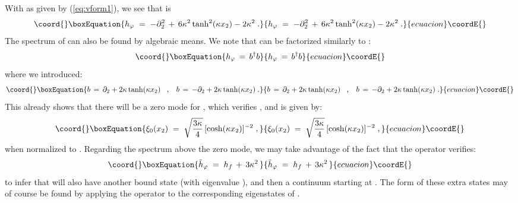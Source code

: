 \documentclass[a4paper,12pt]{article}
\begin{document}
With \coordHE{} as given by (\ref{eq:vform1}), we see that \coordHE{} is
\begin{equation}\coord{}\boxEquation{
h_\varphi \;=\; -\partial_2^2 \,+\, 6 \kappa^2 \tanh^2(\kappa x_2) - 2 \kappa^2 \;.
}{
h_\varphi \;=\; -\partial_2^2 \,+\, 6 \kappa^2 \tanh^2(\kappa x_2) - 2 \kappa^2 \;.
}{ecuacion}\coordE{}\end{equation}
The spectrum of \coordHE{} can also be found  by algebraic means.
We note that \coordHE{} can be factorized similarly to \coordHE{}:
\begin{equation}\coord{}\boxEquation{\label{eq:hphif}
h_\varphi \,=\, b^\dagger b 
}{h_\varphi \,=\, b^\dagger b 
}{ecuacion}\coordE{}\end{equation}
where we introduced: 
\begin{equation}\coord{}\boxEquation{
b \,=\, \partial_2 + 2 \kappa \tanh (\kappa x_2) \;\;\;,\;\;\;
b \,=\, -\partial_2 + 2 \kappa \tanh (\kappa x_2) \;.
}{
b \,=\, \partial_2 + 2 \kappa \tanh (\kappa x_2) \;\;\;,\;\;\;
b \,=\, -\partial_2 + 2 \kappa \tanh (\kappa x_2) \;.
}{ecuacion}\coordE{}\end{equation}
This already shows that there will be a zero mode \coordHE{} for \coordHE{},
which verifies \coordHE{}, and is given by:
\begin{equation}\coord{}\boxEquation{\label{eq:phiz}
\xi_0(x_2)\;=\; \sqrt{\frac{3 \kappa}{4}} \, [\cosh (\kappa x_2)]^{-2}\;,
}{\xi_0(x_2)\;=\; \sqrt{\frac{3 \kappa}{4}} \, [\cosh (\kappa x_2)]^{-2}\;,
}{ecuacion}\coordE{}\end{equation}
when normalized to \coordHE{}. Regarding the spectrum above the zero mode, we may take advantage of the fact that the operator 
\coordHE{} verifies:
\begin{equation}\coord{}\boxEquation{
{\tilde h}_\varphi \;=\; h_f \,+\, 3 \kappa^2 \,
}{
{\tilde h}_\varphi \;=\; h_f \,+\, 3 \kappa^2 \,
}{ecuacion}\coordE{}\end{equation}
to infer that \coordHE{} will also have another bound state (with 
eigenvalue \coordHE{}), and then a continuum starting at \coordHE{}.
The form of these extra states may of course be found by applying
the operator \coordHE{} to the corresponding eigenstates of \coordHE{}. 
\end{document}
